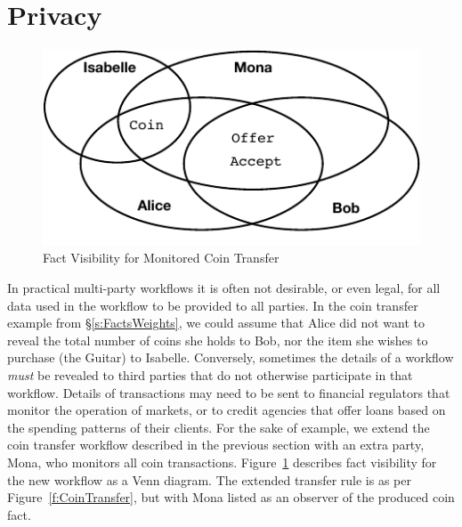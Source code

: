 

\section{Privacy}
\label{s:Privacy}

\begin{figure}
\begin{center}
\includegraphics{figure/coin-transfer-visibility.pdf}
\end{center}
\vspace{-2ex}
\caption{Fact Visibility for Monitored Coin Transfer}
\label{f:CoinTransferVisibility}
\end{figure}

In practical multi-party workflows it is often not desirable, or even legal, for all data used in the workflow to be provided to all parties. In the coin transfer example from \S\ref{s:FactsWeights}, we could assume that Alice did not want to reveal the total number of coins she holds to Bob, nor the item she wishes to purchase (the Guitar) to Isabelle. Conversely, sometimes the details of a workflow \emph{must} be revealed to third parties that do not otherwise participate in that workflow. Details of transactions may need to be sent to financial regulators that monitor the operation of markets, or to credit agencies that offer loans based on the spending patterns of their clients. For the sake of example, we extend the coin transfer workflow described in the previous section with an extra party, Mona, who monitors all coin transactions. Figure~\ref{f:CoinTransferVisibility} describes fact visibility for the new workflow as a Venn diagram. The extended transfer rule is as per Figure~\ref{f:CoinTransfer}, but with Mona listed as an observer of the produced coin fact.


